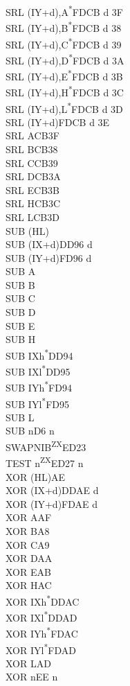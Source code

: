 \documentclass[oneside,a4paper]{book}
\begin{document}
\begin{multicols}{3}
{\begin{tabbing}
SRL (IY+d),A\textsuperscript{*}\>FDCB d 3F\\
SRL (IY+d),B\textsuperscript{*}\>FDCB d 38\\
SRL (IY+d),C\textsuperscript{*}\>FDCB d 39\\
SRL (IY+d),D\textsuperscript{*}\>FDCB d 3A\\
SRL (IY+d),E\textsuperscript{*}\>FDCB d 3B\\
SRL (IY+d),H\textsuperscript{*}\>FDCB d 3C\\
SRL (IY+d),L\textsuperscript{*}\>FDCB d 3D\\
SRL (IY+d)\>FDCB d 3E\\
SRL A\>CB3F\\
SRL B\>CB38\\
SRL C\>CB39\\
SRL D\>CB3A\\
SRL E\>CB3B\\
SRL H\>CB3C\\
SRL L\>CB3D\\
SUB (HL)\\
SUB (IX+d)\>DD96 d\\
SUB (IY+d)\>FD96 d\\
SUB A\\
SUB B\\
SUB C\\
SUB D\\
SUB E\\
SUB H\\
SUB IXh\textsuperscript{*}\>DD94\\
SUB IXl\textsuperscript{*}\>DD95\\
SUB IYh\textsuperscript{*}\>FD94\\
SUB IYl\textsuperscript{*}\>FD95\\
SUB L\\
SUB n\>D6 n\\
SWAPNIB\textsuperscript{ZX}\>ED23\\
TEST n\textsuperscript{ZX}\>ED27 n\\
XOR (HL)\>AE\\
XOR (IX+d)\>DDAE d\\
XOR (IY+d)\>FDAE d\\
XOR A\>AF\\
XOR B\>A8\\
XOR C\>A9\\
XOR D\>AA\\
XOR E\>AB\\
XOR H\>AC\\
XOR IXh\textsuperscript{*}\>DDAC\\
XOR IXl\textsuperscript{*}\>DDAD\\
XOR IYh\textsuperscript{*}\>FDAC\\
XOR IYl\textsuperscript{*}\>FDAD\\
XOR L\>AD\\
XOR n\>EE n

\end{tabbing}
}
\end{multicols}
\normalsize
\end{document}
